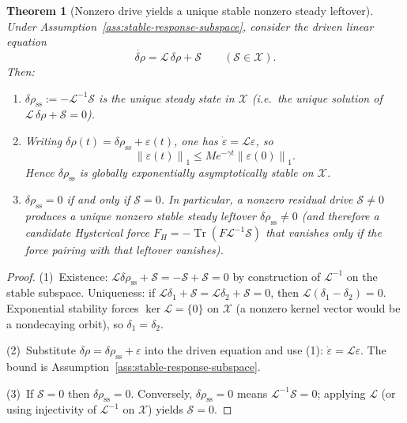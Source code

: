 \documentclass[11pt]{article}
\newtheorem{theorem}{Theorem}[section]
\theoremstyle{definition}
\theoremstyle{remark}
\newcommand{\norm}[1]{\left\lVert #1\right\rVert}
\newcommand{\Tr}{\operatorname{Tr}}
\begin{document}
\begin{theorem}[Nonzero drive yields a unique stable nonzero steady leftover]
\label{thm:stable-steady}
Under Assumption~\ref{ass:stable-response-subspace}, consider the driven linear equation
\begin{equation}
  \dot{\delta\rho}=\mathcal L\,\delta\rho+\mathcal S
  \qquad(\mathcal S\in\mathcal X).
\end{equation}
Then:
\begin{enumerate}
\item $\delta\rho_{\mathrm{ss}}:=-\mathcal L^{-1}\mathcal S$ is the unique steady state in $\mathcal X$
  (i.e.\ the unique solution of $\mathcal L\,\delta\rho+\mathcal S=0$).
\item Writing $\delta\rho(t)=\delta\rho_{\mathrm{ss}}+\varepsilon(t)$, one has $\dot\varepsilon=\mathcal L\varepsilon$, so
  \begin{equation}
    \norm{\varepsilon(t)}_1\le M e^{-\gamma t}\norm{\varepsilon(0)}_1.
  \end{equation}
  Hence $\delta\rho_{\mathrm{ss}}$ is globally exponentially asymptotically stable on $\mathcal X$.
\item $\delta\rho_{\mathrm{ss}}=0$ if and only if $\mathcal S=0$.
  In particular, a nonzero residual drive $\mathcal S\neq0$ produces a unique nonzero stable steady leftover $\delta\rho_{\mathrm{ss}}\neq0$ (and therefore a candidate Hysterical force $F_H=-\Tr(F\mathcal L^{-1}\mathcal S)$ that vanishes only if the force pairing with that leftover vanishes).
\end{enumerate}
\end{theorem}

\begin{proof}
(1)~Existence: $\mathcal L\delta\rho_{\mathrm{ss}}+\mathcal S=-\mathcal S+\mathcal S=0$ by construction of $\mathcal L^{-1}$ on the stable subspace.
Uniqueness: if $\mathcal L\delta_1+\mathcal S=\mathcal L\delta_2+\mathcal S=0$, then $\mathcal L(\delta_1-\delta_2)=0$.
Exponential stability forces $\ker\mathcal L=\{0\}$ on $\mathcal X$ (a nonzero kernel vector would be a nondecaying orbit), so $\delta_1=\delta_2$.

(2)~Substitute $\delta\rho=\delta\rho_{\mathrm{ss}}+\varepsilon$ into the driven equation and use (1):
$\dot\varepsilon=\mathcal L\varepsilon$.
The bound is Assumption~\ref{ass:stable-response-subspace}.

(3)~If $\mathcal S=0$ then $\delta\rho_{\mathrm{ss}}=0$.
Conversely, $\delta\rho_{\mathrm{ss}}=0$ means $\mathcal L^{-1}\mathcal S=0$; applying $\mathcal L$ (or using injectivity of $\mathcal L^{-1}$ on $\mathcal X$) yields $\mathcal S=0$.
\end{proof}
\end{document}
